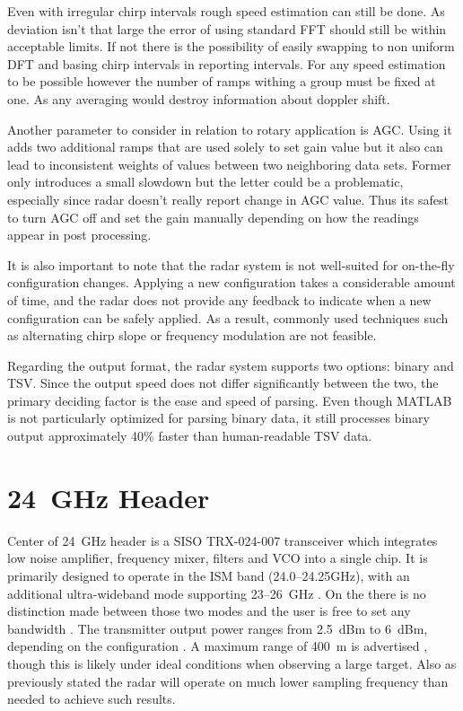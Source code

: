 Even with irregular chirp intervals rough speed estimation can still be done.
As deviation isn't that large the error of using standard FFT should still be within acceptable limits.
If not there is the possibility of easily swapping to non uniform DFT and basing chirp intervals in reporting intervals.
For any speed estimation to be possible however the number of ramps withing a group must be fixed at one.
As any averaging would destroy information about doppler shift.

Another parameter to consider in relation to rotary application is AGC.
Using it adds two additional ramps that are used solely to set gain value but it also can lead to inconsistent weights of values between two neighboring data sets.
Former only introduces a small slowdown but the letter could be a problematic, especially since radar doesn't really report change in AGC value.
Thus its safest to turn AGC off and set the gain manually depending on how the readings appear in post processing.

It is also important to note that the radar system is not well-suited for on-the-fly configuration changes.
Applying a new configuration takes a considerable amount of time, and the radar does not provide any feedback to indicate when a new configuration can be safely applied.
As a result, commonly used techniques such as alternating chirp slope or frequency modulation are not feasible.

Regarding the output format, the radar system supports two options: binary and TSV.
Since the output speed does not differ significantly between the two, the primary deciding factor is the ease and speed of parsing.
Even though MATLAB is not particularly optimized for parsing binary data, it still processes binary output approximately 40\% faster than human-readable TSV data.

\section{24~GHz Header}

Center of 24~GHz header is a SISO TRX-024-007 transceiver which integrates low noise amplifier, frequency mixer, filters and VCO into a single chip.
It is primarily designed to operate in the ISM band (24.0--24.25GHz), with an additional ultra-wideband mode supporting 23--26~GHz \cite{sidarTRX24}.
On the \sidar there is no distinction made between  those two modes and the user is free to set any bandwidth \cite{sidarPRO} .
The transmitter output power ranges from 2.5~dBm to 6~dBm, depending on the configuration \cite{sidarTRX24}.
A maximum range of 400~m is advertised \cite{sidarMANOld}, though this is likely under ideal conditions when observing a large target.
Also as previously stated the radar will operate on much lower sampling frequency than needed to achieve such results.


